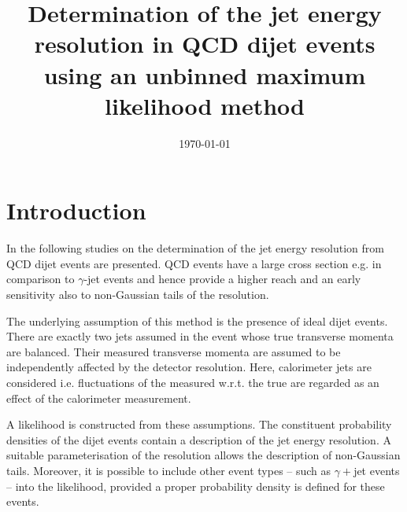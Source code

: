 \documentclass[a4paper]{cmspaper} %
\begin{document}
\begin{titlepage}
  \date{\today}
  \title{Determination of the jet energy resolution in QCD dijet
    events using an unbinned maximum likelihood method}
\end{titlepage}

\section{Introduction}
In the following studies on the determination of the jet energy resolution from QCD dijet events are presented.
QCD events have a large cross section e.g. in comparison to $\gamma$-jet events and hence provide a higher \pt reach and an early sensitivity also to non-Gaussian tails of the resolution.

The underlying assumption of this method is the presence of ideal dijet events.
There are exactly two jets assumed in the event whose true transverse momenta are balanced.
Their measured transverse momenta are assumed to be independently affected by the detector resolution.
Here, calorimeter jets are considered i.e. fluctuations of the measured \pt w.r.t. the true \pt are regarded as an effect of the calorimeter measurement.

A likelihood is constructed from these assumptions.
The constituent probability densities of the dijet events contain a description of the jet energy resolution.
A suitable parameterisation of the resolution allows the description of non-Gaussian tails.
Moreover, it is possible to include other event types -- such as $\gamma+$jet events -- into the likelihood, provided a proper probability density is defined for these events.
\end{document}
